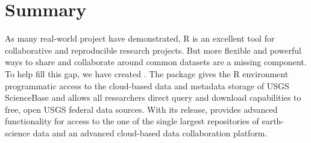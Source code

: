 \section{Summary}

As many real-world project have demonstrated, R is 
an excellent tool for collaborative and reproducible 
research projects. But more flexible and powerful
ways to share and collaborate around common datasets
are a missing component. To help fill this gap, we 
have created . The  package
gives the R environment programmatic access to the 
cloud-based data and metadata storage of USGS ScienceBase 
and allows all researchers direct query and download 
capabilities to free, open USGS federal data sources. 
With its release,  provides advanced
functionality for access to the one of the single 
largest repositories of earth-science data and an advanced 
cloud-based data collaboration platform.

